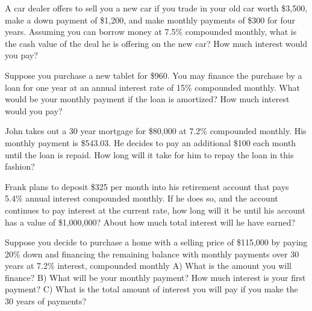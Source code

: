 \documentclass[11pt,epsfig]{article}
\begin{document}
\begin{problem}{12}
A car dealer offers to sell you a new car if you trade in your old car worth \$3,500, make a down payment of \$1,200, and make monthly payments of \$300 for four years. Assuming you can borrow money at 7.5\% compounded monthly, what is the cash value of the deal he is offering on the new car? How much interest would you pay?
  
\vfill
\end{problem}


\newpage


\begin{problem}{12}
Suppose you purchase a new tablet for \$960. You may finance the purchase by a loan for one year at an annual interest rate of 15\% compounded monthly. What would be your monthly payment if the loan is amortized? How much interest would you pay?

\vfill
\end{problem}

\begin{problem}{12}
John takes out a 30 year mortgage for \$80,000 at 7.2\% compounded monthly. His monthly payment is \$543.03. He decides to pay an additional \$100 each month until the loan is repaid. How long will it take for him to repay the loan in this fashion? 


\vfill
\end{problem}

\begin{problem}{12}
Frank plans to deposit \$325 per month into his retirement account that pays 5.4\% annual interest compounded monthly. If he does so, and the account continues to pay interest at the current rate, how long will it be until his account has a value of \$1,000,000? About how much total interest will he have earned?

\vfill
\end{problem}
\newpage
\begin{problem}{12}
Suppose you decide to purchase a home with a selling price of \$115,000 by paying 20\% down and financing the remaining balance with monthly payments over 30 years at 7.2\% interest, compounded monthly
\newline
A) What is the amount you will finance?
\newline
B) What will be your monthly payment? How much interest is your first payment?
\newline
C) What is the total amount of interest you will pay if you make the 30 years of payments?


\vfill
\end{problem}



\showpoints
\end{document}
